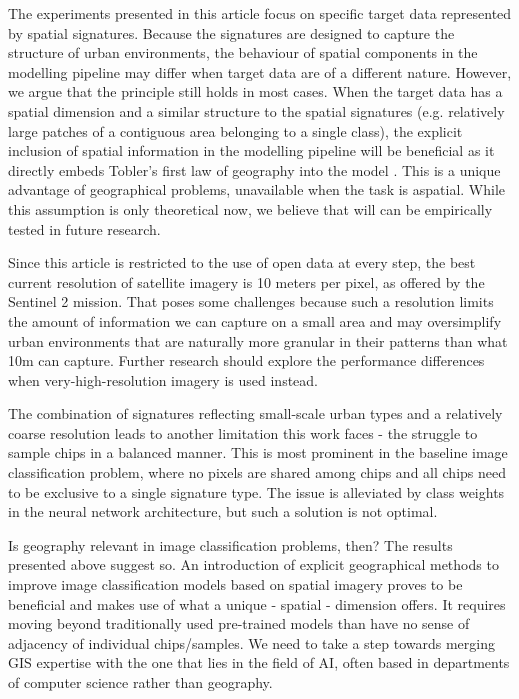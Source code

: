 The experiments presented in this article focus on specific target data represented by
spatial signatures. Because the signatures are designed to capture the structure of
urban environments, the behaviour of spatial components in the modelling pipeline may
differ when target data are of a different nature. However, we argue that the principle
still holds in most cases. When the target data has a spatial dimension and a similar
structure to the spatial signatures (e.g. relatively large patches of a contiguous area
belonging to a single class), the explicit inclusion of spatial information in the
modelling pipeline will be beneficial as it directly embeds Tobler's first law of
geography into the model \citep{tobler1970computer}. This is a unique advantage of
geographical problems, unavailable when the task is aspatial. While this assumption is
only theoretical now, we believe that will can be empirically tested in future research.

Since this article is restricted to the use of open data at every step, the best current
resolution of satellite imagery is 10 meters per pixel, as offered by the Sentinel 2
mission. That poses some challenges because such a resolution limits the amount of
information we can capture on a small area and may oversimplify urban environments that
are naturally more granular in their patterns than what 10m can capture. Further
research should explore the performance differences when very-high-resolution
imagery is used instead.

The combination of signatures reflecting small-scale urban types and a relatively coarse
resolution leads to another limitation this work faces - the struggle to sample chips
in a balanced manner. This is most prominent in the baseline image classification
problem, where no pixels are shared among chips and all chips need to be exclusive to a
single signature type. The issue is alleviated by class weights in the neural network
architecture, but such a solution is not optimal.

Is geography relevant in image classification problems, then? The results presented
above suggest so. An introduction of explicit geographical methods to improve image
classification models based on spatial imagery proves to be beneficial and makes use of what a
unique - spatial - dimension offers. It requires moving beyond traditionally used
pre-trained models than have no sense of adjacency of individual chips/samples. We need
to take a step towards merging GIS expertise with the one that lies in the field of
AI, often based in departments of computer science rather than geography.

